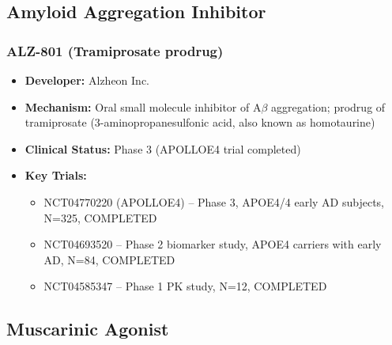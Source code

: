 \documentclass[11pt, a4paper]{article}
\begin{document}
\subsection{Amyloid Aggregation Inhibitor}

\subsubsection{ALZ-801 (Tramiprosate prodrug)}
\begin{itemize}
    \item \textbf{Developer:} Alzheon Inc.
    \item \textbf{Mechanism:} Oral small molecule inhibitor of A$\beta$ aggregation; prodrug of tramiprosate (3-aminopropanesulfonic acid, also known as homotaurine)
    \item \textbf{Clinical Status:} Phase 3 (APOLLOE4 trial completed)
    \item \textbf{Key Trials:}
    \begin{itemize}
        \item NCT04770220 (APOLLOE4) -- Phase 3, APOE4/4 early AD subjects, N=325, COMPLETED
        \item NCT04693520 -- Phase 2 biomarker study, APOE4 carriers with early AD, N=84, COMPLETED
        \item NCT04585347 -- Phase 1 PK study, N=12, COMPLETED
    \end{itemize}
\end{itemize}

\subsection{Muscarinic Agonist}
\end{document}
